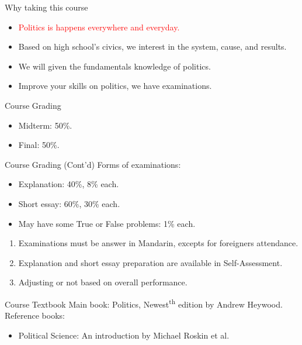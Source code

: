\documentclass{beamer}
\begin{document}
\begin{frame}{Why taking this course}
\begin{itemize}
\pause
\item \textcolor{red}{Politics is happens everywhere and everyday.}
\pause
\item Based on high school's civics, we interest in the system, cause, and results.
\pause
\item We will given the fundamentals knowledge of politics.
\pause
\item Improve your skills on politics, we have examinations.
\end{itemize}
\end{frame}
\begin{frame}{Course Grading}
\begin{itemize}
\pause
\item Midterm: 50\%.
\vspace{1em}
\pause
\item Final: 50\%.
\end{itemize}
\end{frame}
\begin{frame}{Course Grading (Cont'd)}
\pause
Forms of examinations:
\pause
\begin{itemize}
    \item Explanation: 40\%, 8\% each.
    \pause
    \item Short essay: 60\%, 30\% each.
    \pause
    \item May have some True or False problems: 1\% each.
\end{itemize}
\pause
\begin{enumerate}
\item Examinations must be answer in Mandarin, excepts for foreigners attendance.
\pause
\item Explanation and short essay preparation are available in Self-Assessment.
\pause
\item Adjusting or not based on overall performance.
\end{enumerate}
\end{frame}
\begin{frame}{Course Textbook}
\pause
Main book: Politics, Newest\textsuperscript{th} edition by Andrew Heywood. \\
\pause
Reference books:
\begin{itemize}
\pause
\item Political Science: An introduction by Michael Roskin et al.
\end{itemize}
\end{frame}
\end{document}

